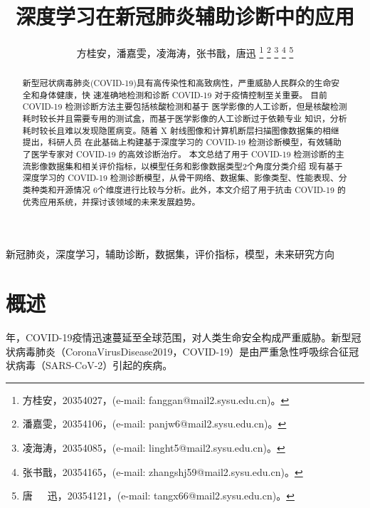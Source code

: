 \documentclass[journal,twoside,web]{ieeecolor}
\begin{document}
\title{深度学习在新冠肺炎辅助诊断中的应用}
\author{方桂安，潘嘉雯，凌海涛，张书戬，唐迅
\thanks{方桂安，20354027，(e-mail: fanggan@mail2.sysu.edu.cn)。}
\thanks{潘嘉雯，20354106，(e-mail: panjw6@mail2.sysu.edu.cn)。}
\thanks{凌海涛，20354085，(e-mail: linght5@mail2.sysu.edu.cn)。}
\thanks{张书戬，20354165，(e-mail: zhangshj59@mail2.sysu.edu.cn)。}
\thanks{唐~~~迅，20354121，(e-mail: tangx66@mail2.sysu.edu.cn)。}}

\maketitle

\begin{abstract}
新型冠状病毒肺炎(COVID-19)具有高传染性和高致病性，严重威胁人民群众的生命安全和身体健康，快  
速准确地检测和诊断 COVID-19 对于疫情控制至关重要。 
目前 COVID-19 检测诊断方法主要包括核酸检测和基于  
医学影像的人工诊断，但是核酸检测耗时较长并且需要专用的测试盒，而基于医学影像的人工诊断过于依赖专业  
知识，分析耗时较长且难以发现隐匿病变。随着 X 射线图像和计算机断层扫描图像数据集的相继提出，科研人员  
在此基础上构建基于深度学习的 COVID-19 检测诊断模型，有效辅助了医学专家对 COVID-19 的高效诊断治疗。 
本文总结了用于 COVID-19 检测诊断的主流影像数据集和相关评价指标，以模型任务和影像数据类型2个角度分类介绍  
现有基于深度学习的 COVID-19 检测诊断模型，从骨干网络、数据集、影像类型、性能表现、分类种类和开源情况  
6个维度进行比较与分析。此外，本文介绍了用于抗击 COVID-19 的优秀应用系统，并探讨该领域的未来发展趋势。
\end{abstract}

\begin{IEEEkeywords}
新冠肺炎，深度学习，辅助诊断，数据集，评价指标，模型，未来研究方向
\end{IEEEkeywords}

\section{概述}
年，COVID-19疫情迅速蔓延至全球范围，对人类生命安全构成严重威胁。新型冠状病毒肺炎（CoronaVirusDisease2019，COVID-19）是由严重急性呼吸综合征冠状病毒（SARS-CoV-2）引起的疾病。
\end{document}

